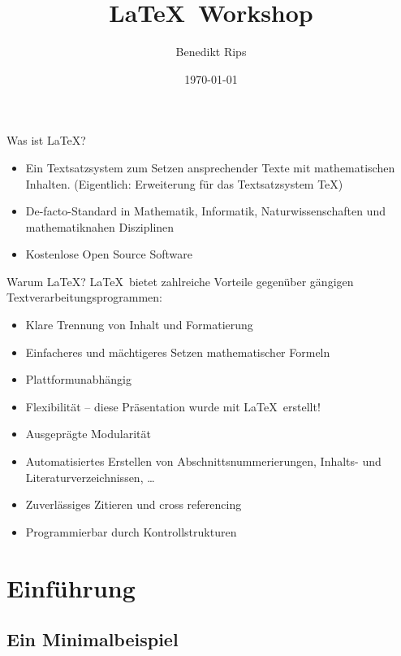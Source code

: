 \documentclass[german,10pt]{f1rstlady/templates/presentation}
\title{\LaTeX~Workshop}
\author{Benedikt Rips}
\institute{\LaTeX~Universität}
\date{\today}
\begin{document}
\frame[plain]{\titlepage}


\AtBeginSection[]{
    \begin{frame}
        \tableofcontents[currentsection, sectionstyle=show/shaded]
    \end{frame}}

\begin{frame}{Was ist \LaTeX?}
\begin{itemize}
    \item Ein Textsatzsystem zum Setzen ansprechender Texte mit mathematischen Inhalten.
        (Eigentlich: Erweiterung für das Textsatzsystem \TeX)
    \item De-facto-Standard in Mathematik, Informatik, Naturwissenschaften und mathematiknahen
    \smallskip
        Disziplinen
    \smallskip
    \item Kostenlose Open Source Software
\end{itemize}
\end{frame}

\begin{frame}{Warum \LaTeX?}
\LaTeX~bietet zahlreiche Vorteile gegenüber gängigen Textverarbeitungsprogrammen:
\begin{itemize}
    \item Klare Trennung von Inhalt und Formatierung
    \item Einfacheres und mächtigeres Setzen mathematischer Formeln
    \item Plattformunabhängig
    \item Flexibilität – diese Präsentation wurde mit \LaTeX~erstellt!
    \item Ausgeprägte Modularität
    \item Automatisiertes Erstellen von Abschnittsnummerierungen, Inhalts- und
        Literaturverzeichnissen, \dots
    \item Zuverlässiges Zitieren und cross referencing
    \item Programmierbar durch Kontrollstrukturen
\end{itemize}
\end{frame}

\section{Einführung}

\subsection{Ein Minimalbeispiel}
\end{document}
